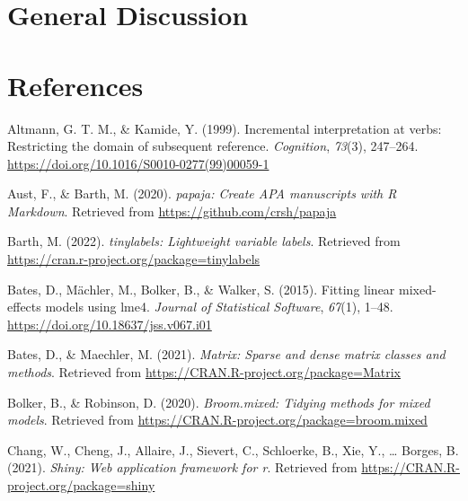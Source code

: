 \documentclass[
  man,floatsintext]{apa6}
\newlength{\cslhangindent}
\newlength{\cslentryspacingunit} %
\newenvironment{CSLReferences}[2] %
 {%
  \setlength{\parindent}{0pt}
  \ifodd #1
  \let\oldpar\par
  \def\par{\hangindent=\cslhangindent\oldpar}
  \fi
  \setlength{\parskip}{#2\cslentryspacingunit}
 }%
 {}
\begin{document}
\hypertarget{general-discussion}{%
\section{General Discussion}\label{general-discussion}}

\newpage

\hypertarget{references}{%
\section{References}\label{references}}

\begingroup
\setlength{\parindent}{-0.5in}
\setlength{\leftskip}{0.5in}

\hypertarget{refs}{}
\begin{CSLReferences}{1}{0}
\leavevmode{}%
Altmann, G. T. M., \& Kamide, Y. (1999). Incremental interpretation at verbs: Restricting the domain of subsequent reference. \emph{Cognition}, \emph{73}(3), 247--264. \url{https://doi.org/10.1016/S0010-0277(99)00059-1}

\leavevmode{}%
Aust, F., \& Barth, M. (2020). \emph{{papaja}: {Create} {APA} manuscripts with {R Markdown}}. Retrieved from \url{https://github.com/crsh/papaja}

\leavevmode{}%
Barth, M. (2022). \emph{{tinylabels}: Lightweight variable labels}. Retrieved from \url{https://cran.r-project.org/package=tinylabels}

\leavevmode{}%
Bates, D., Mächler, M., Bolker, B., \& Walker, S. (2015). Fitting linear mixed-effects models using {lme4}. \emph{Journal of Statistical Software}, \emph{67}(1), 1--48. \url{https://doi.org/10.18637/jss.v067.i01}

\leavevmode{}%
Bates, D., \& Maechler, M. (2021). \emph{Matrix: Sparse and dense matrix classes and methods}. Retrieved from \url{https://CRAN.R-project.org/package=Matrix}

\leavevmode{}%
Bolker, B., \& Robinson, D. (2020). \emph{Broom.mixed: Tidying methods for mixed models}. Retrieved from \url{https://CRAN.R-project.org/package=broom.mixed}

\leavevmode{}%
Chang, W., Cheng, J., Allaire, J., Sievert, C., Schloerke, B., Xie, Y., \ldots{} Borges, B. (2021). \emph{Shiny: Web application framework for r}. Retrieved from \url{https://CRAN.R-project.org/package=shiny}


\end{CSLReferences}
\end{document}
